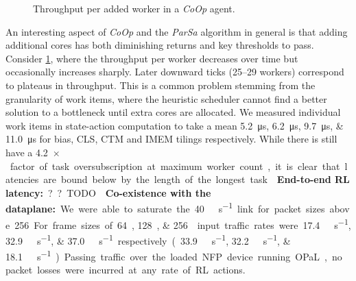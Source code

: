 \documentclass[sigconf,natbib=false]{acmart}
\newcommand{\fakepara}[1]{\noindent\textbf{#1:}}
\newcommand{\approachshort}{OPaL}
\newcommand{\Coopfw}{\emph{CoOp}}
\begin{document}
\begin{figure}
	\caption{Throughput per added worker in a \Coopfw{} agent. \label{fig:tput-per-core}}
\end{figure}

An interesting aspect of \Coopfw{} and the \emph{ParSa} algorithm in general is that adding additional cores has both diminishing returns and key thresholds to pass.
Consider \cref{fig:tput-per-core}, where the throughput per worker decreases over time but occasionally increases sharply.
Later downward ticks (\numrange{25}{29} workers) correspond to plateaus in throughput.
This is a common problem stemming from the granularity of work items, where the heuristic scheduler cannot find a better solution to a bottleneck until extra cores are allocated.
We measured individual work items in state-action computation to take a mean \SIlist{5.2; 6.2; 9.7; 11.0}{\micro\second} for bias, CLS, CTM and IMEM tilings respectively.
While there is still have a \SI{4.2}{$\times$} factor of task oversubscription at maximum worker count, it is clear that latencies are bound below by the length of the longest task.

\fakepara{End-to-end RL latency}
?? TODO

\fakepara{Co-existence with the dataplane}
We were able to saturate the \SI{40}{\giga\bit\per\second} link for packet sizes above \SI{256}{\byte}.
For frame sizes of \SIlist{64;128;256}{\byte} input traffic rates were \SIlist{17.4;32.9;37.0}{\giga\bit\per\second} respectively (\SIlist[per-symbol=p,sticky-per=true]{33.9;32.2;18.1}{\mega\packet\per\second}).
Passing traffic over the loaded NFP device running \approachshort, no packet losses were incurred at any rate of RL actions.
\end{document}
